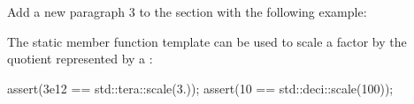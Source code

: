\documentclass[ebook,11pt,article]{memoir}
\begin{document}
\pnum
\pnum
Add a new paragraph 3 to the section with the following example:

\begin{addedblock}
\pnum
\begin{example} The  static member function template can be used to scale a factor by the quotient represented by a : 
\begin{codeblock}
 	assert(3e12 == std::tera::scale(3.));
	assert(10 == std::deci::scale(100));
\end{codeblock}
\end{example}
\end{addedblock}
\end{document}
